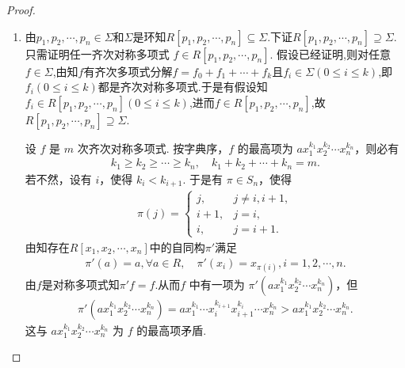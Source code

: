 \documentclass[../../main.tex]{subfiles}%
\begin{document}
\begin{proof}
\begin{enumerate}[(1)]
\item 由$p_1,p_2,\cdots,p_n\in \Sigma$和$\Sigma$是环知$R[p_1,p_2,\cdots,p_n]\subseteq \Sigma.$下证$R[p_1,p_2,\cdots,p_n]\supseteq \Sigma.$
只需证明任一齐次对称多项式 \( f \in R[p_1, p_2, \cdots, p_n] \). 假设已经证明,则对任意$ f\in \Sigma$,由知$f$有齐次多项式分解$f=f_0+f_1+\cdots+f_k$且$f_i\in \Sigma(0\leqslant i\leqslant k)$,即$f_i(0\leqslant i\leqslant k)$都是齐次对称多项式.于是有假设知$f_i\in R[p_1,p_2,\cdots,p_n](0\leqslant i\leqslant k)$,进而$f\in R[p_1,p_2,\cdots,p_n]$,故$R[p_1,p_2,\cdots,p_n]\supseteq \Sigma.$

设 \( f \) 是 \( m \) 次齐次对称多项式. 按字典序，\( f \) 的最高项为 \( a x_1^{k_1} x_2^{k_2} \cdots x_n^{k_n} \)，则必有
\begin{align*}
k_1 \geqslant k_2 \geqslant \cdots \geqslant k_n, \quad k_1 + k_2 + \cdots + k_n = m.
\end{align*}
若不然，设有 \( i \)，使得 \( k_i < k_{i+1} \). 于是有 \( \pi \in S_n \)，使得
\begin{align*}
\pi(j) = \begin{cases}
j, & j \neq i, i+1, \\
i+1, & j = i, \\
i, & j = i+1.
\end{cases}
\end{align*}
由知存在$R[x_1,x_2,\cdots,x_n]$中的自同构$\pi'$满足
\begin{align*}
\pi'(a) = a, \forall a \in R, \quad \pi'(x_i) = x_{\pi(i)}, i = 1, 2, \cdots, n.
\end{align*}
由$f$是对称多项式知\( \pi' f = f \).从而\( f \) 中有一项为 \( \pi'(a x_1^{k_1} x_2^{k_2} \cdots x_n^{k_n}) \)，但
\begin{align*}
\pi'(ax_{1}^{k_1}x_{2}^{k_2}\cdots x_{n}^{k_n})=ax_{1}^{k_1}\cdots x_{i}^{k_{i+1}}x_{i+1}^{k_i}\cdots x_{n}^{k_n}>ax_{1}^{k_1}x_{2}^{k_2}\cdots x_{n}^{k_n}.
\end{align*}
这与 \( a x_1^{k_1} x_2^{k_2} \cdots x_n^{k_n} \) 为 \( f \) 的最高项矛盾.


\end{enumerate}
\end{proof}
\end{document}
